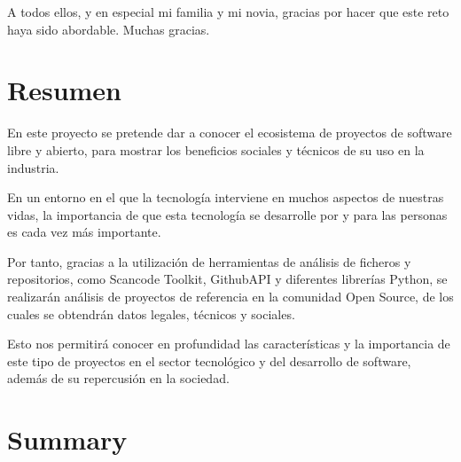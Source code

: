 \documentclass[a4paper, spanish, 12pt]{book}
\begin{document}
A todos ellos, y en especial mi familia y mi novia, gracias por hacer que este reto
haya sido abordable. Muchas gracias.


\chapter*{Resumen}

En este proyecto se pretende dar a conocer el ecosistema de proyectos de software
libre y abierto, para mostrar los beneficios sociales y t\'ecnicos de su uso en la industria.\par
\vspace{0.3cm}
En un entorno en el que la tecnolog\'ia interviene en muchos aspectos de nuestras vidas,
la importancia de que esta tecnolog\'ia se desarrolle por y para las personas es
cada vez m\'as importante.\par
\vspace{0.3cm}
Por tanto, gracias a la utilizaci\'on de herramientas de an\'alisis de ficheros y repositorios,
como Scancode Toolkit, GithubAPI y diferentes librer\'ias Python, se realizar\'an
an\'alisis de proyectos de referencia en la comunidad Open Source, de los cuales se obtendr\'an
datos legales, t\'ecnicos y sociales.\par
\vspace{0.3cm}
Esto nos permitir\'a conocer en profundidad las caracter\'isticas y la importancia de este tipo de
proyectos en el sector tecnol\'ogico y del desarrollo de software, adem\'as de
su repercusi\'on en la sociedad.


\chapter*{Summary}
\end{document}
